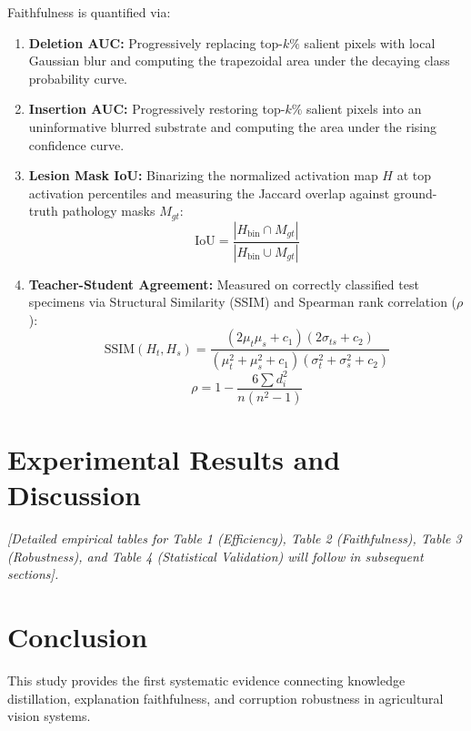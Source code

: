 \documentclass[journal,10pt,twocolumn]{article}
\begin{document}
Faithfulness is quantified via:
\begin{enumerate}
    \item \textbf{Deletion AUC:} Progressively replacing top-$k\%$ salient pixels with local Gaussian blur and computing the trapezoidal area under the decaying class probability curve.
    \item \textbf{Insertion AUC:} Progressively restoring top-$k\%$ salient pixels into an uninformative blurred substrate and computing the area under the rising confidence curve.
    \item \textbf{Lesion Mask IoU:} Binarizing the normalized activation map $H$ at top activation percentiles and measuring the Jaccard overlap against ground-truth pathology masks $M_{gt}$:
    \begin{equation}
        \text{IoU} = \frac{|H_{\text{bin}} \cap M_{gt}|}{|H_{\text{bin}} \cup M_{gt}|}
    \end{equation}
    \item \textbf{Teacher-Student Agreement:} Measured on correctly classified test specimens via Structural Similarity (SSIM) and Spearman rank correlation ($\rho$):
    \begin{equation}
        \text{SSIM}(H_t, H_s) = \frac{(2\mu_t\mu_s + c_1)(2\sigma_{ts} + c_2)}{(\mu_t^2 + \mu_s^2 + c_1)(\sigma_t^2 + \sigma_s^2 + c_2)}
    \end{equation}
    \begin{equation}
        \rho = 1 - \frac{6 \sum d_i^2}{n(n^2 - 1)}
    \end{equation}
\end{enumerate}

\section{Experimental Results and Discussion}
\label{sec:results}
\textit{[Detailed empirical tables for Table 1 (Efficiency), Table 2 (Faithfulness), Table 3 (Robustness), and Table 4 (Statistical Validation) will follow in subsequent sections].}

\section{Conclusion}
\label{sec:conclusion}
This study provides the first systematic evidence connecting knowledge distillation, explanation faithfulness, and corruption robustness in agricultural vision systems.
\end{document}
